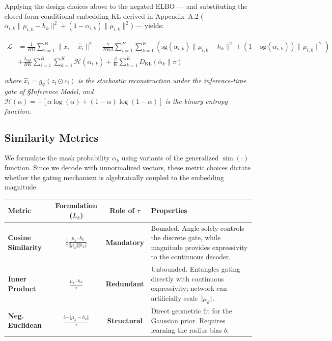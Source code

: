 \documentclass[11pt, a4paper]{article}
\begin{document}
Applying the design choices above to the negated ELBO --- and substituting the closed-form conditional embedding KL derived in Appendix~A.2 ($\alpha_{i,k}\|\mu_{i,k} - h_k\|^2 + (1-\alpha_{i,k})\|\mu_{i,k}\|^2$) --- yields:

\begin{equation}
    \begin{aligned}
        \mathcal{L} &= \frac{1}{B D} \sum_{i=1}^B \|x_i - \hat{x}_i\|^2
        + \frac{\gamma}{B K d} \sum_{i=1}^B \sum_{k=1}^K \left( \text{sg}(\alpha_{i,k}) \|\mu_{i,k} - h_k\|^2 + (1 - \text{sg}(\alpha_{i,k})) \|\mu_{i,k}\|^2 \right) \\
        &+ \frac{\lambda_{\text{ent}}}{B K} \sum_{i=1}^B \sum_{k=1}^K \mathcal{H}(\alpha_{i,k})
        + \frac{\beta}{K} \sum_{k=1}^K D_{\mathrm{KL}}(\bar{\alpha}_k \parallel \pi)
    \end{aligned}
\end{equation}

\noindent \textit{where $\hat{x}_i = g_\phi(z_i \odot c_i)$ is the stochastic reconstruction under the inference-time gate of \S Inference Model, and $\mathcal{H}(\alpha) = -[\alpha \log(\alpha) + (1-\alpha) \log(1-\alpha)]$ is the binary entropy function.}

\subsection{Similarity Metrics}

We formulate the mask probability $\alpha_k$ using variants of the generalized $\operatorname{sim}(\cdot)$ function. Since we decode with unnormalized vectors, these metric choices dictate whether the gating mechanism is algebraically coupled to the embedding magnitude.

\begin{table}[h]
\centering
\renewcommand{\arraystretch}{1.5}
\begin{tabular}{>{\bfseries}l c c p{6cm}}
\toprule
Metric & Formulation ($L_k$) & Role of $\tau$ & Properties \\
\midrule
Cosine Similarity & $\frac{1}{\tau} \frac{\mu_k \cdot h_k}{\Vert \mu_k \Vert \Vert h_k \Vert}$ & \textbf{Mandatory} & Bounded. Angle solely controls the discrete gate, while magnitude provides expressivity to the continuous decoder. \\
Inner Product & $\frac{\mu_k \cdot h_k}{\tau}$ & \textbf{Redundant} & Unbounded. Entangles gating directly with continuous expressivity; network can artificially scale $\Vert \mu_k \Vert$. \\
Neg. Euclidean & $\frac{b - \Vert \mu_k - h_k \Vert}{\tau}$ & \textbf{Structural} & Direct geometric fit for the Gaussian prior. Requires learning the radius bias $b$. \\
\bottomrule
\end{tabular}
\end{table}
\end{document}
